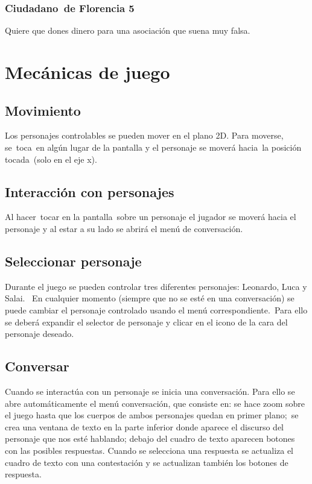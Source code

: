\subsubsection[Ciudadano\ de Florencia 5]{ Ciudadano\ de Florencia 5}
\hypertarget{Toc484614248}{}{
\foreignlanguage{spanish}{Quiere que dones dinero para una asociaci\'on que suena muy falsa.}}

\section[Mec\'anicas de juego]{ Mec\'anicas de juego}
\hypertarget{Toc484614249}{}\subsection[Movimiento]{ Movimiento}
\hypertarget{Toc484614250}{}{
Los personajes controlables se pueden mover en el plano 2D. Para moverse, se\ toca\ en alg\'un lugar de la pantalla y el
personaje se mover\'a hacia\ la posici\'on tocada\ (solo en el eje x).}

\subsection[Interacci\'on con personajes]{ Interacci\'on con personajes}
\hypertarget{Toc484614251}{}{
Al hacer\ tocar en la pantalla\ sobre un personaje el jugador se mover\'a hacia el personaje y al estar a su lado se
abrir\'a el men\'u de conversaci\'on.}

\subsection[Seleccionar personaje]{ Seleccionar personaje}
\hypertarget{Toc484614252}{}{
Durante el juego se pueden controlar tres diferentes personajes: Leonardo, Luca y Salai. \ En cualquier momento (siempre
que no se est\'e en una conversaci\'on) se puede cambiar el personaje controlado usando el men\'u
correspondiente.\ Para ello se deber\'a expandir el selector de personaje y clicar en el icono de la cara del personaje
deseado.}

\subsection[Conversar]{ Conversar}
\hypertarget{Toc484614253}{}{
Cuando se interact\'ua con un personaje se inicia una conversaci\'on. Para ello se abre autom\'aticamente el men\'u
conversaci\'on, que consiste en: se hace zoom sobre el juego hasta que los cuerpos de ambos personajes quedan en primer
plano;\ se crea una ventana de texto en la parte inferior donde aparece el discurso del personaje que nos est\'e
hablando; debajo del cuadro de texto aparecen botones con las posibles respuestas. Cuando se selecciona una respuesta
se actualiza el cuadro de texto con una contestaci\'on y se actualizan tambi\'en los botones de respuesta.}

